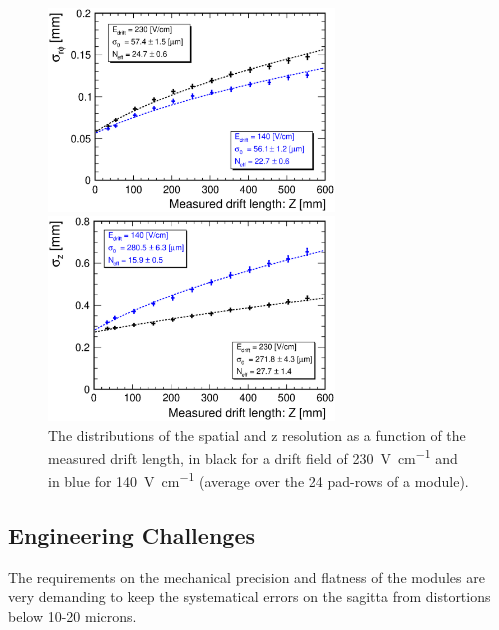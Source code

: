 \begin{figure}
    \begin{minipage}{0.5\hsize}
        \begin{center}
        \includegraphics[width=76mm]{Tracker/TPC_Bonn/plots/fig200411_resoX_mod3_24Nov_B1_Ed230Vcm_Ed140Vcm}
        \end{center}
    \end{minipage}
    \begin{minipage}{0.5\hsize}
        \begin{center}
        \includegraphics[width=76mm]{Tracker/TPC_Bonn/plots/fig200411_resoZ_mod3_24Nov_B1_Ed230Vcm_Ed140Vcm}
        \end{center}
    \end{minipage}
\caption{The distributions of the spatial and z resolution as a function of the measured drift length, in black for a drift field of \SI{230}{\volt\per\centi\meter} and in blue for \SI{140}{\volt\per\centi\meter} (average over the 24 pad-rows of a module).}
\label{fig:fig421}
\end{figure}


\subsection{Engineering Challenges}
The requirements on the mechanical precision and flatness of the modules are very demanding to keep the systematical errors on the sagitta from distortions below 10-20 microns.

